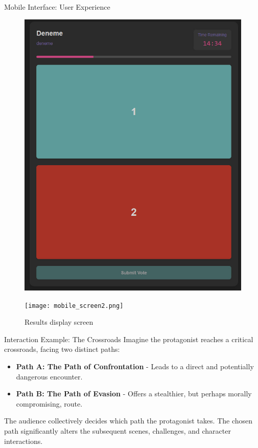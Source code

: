 \documentclass[aspectratio=169]{beamer}
\begin{document}
\begin{frame}{Mobile Interface: User Experience}
    \begin{figure}[h]
        \begin{minipage}{0.45\textwidth}
            \centering
            \includegraphics[height=0.7\textheight]{mobile_screen1.jpg}
            \caption{Audience voting interface}
        \end{minipage}
        \hfill
        \begin{minipage}{0.45\textwidth}
            \centering
            \texttt{[image: mobile\_screen2.png]}
            \caption{Results display screen}
        \end{minipage}
    \end{figure}
\end{frame}


\begin{frame}{Interaction Example: The Crossroads}
    Imagine the protagonist reaches a critical crossroads, facing two distinct paths:
    \begin{itemize}
        \item \textbf{Path A: The Path of Confrontation} - Leads to a direct and potentially dangerous encounter.
        \item \textbf{Path B: The Path of Evasion} - Offers a stealthier, but perhaps morally compromising, route.
    \end{itemize}
    The audience collectively decides which path the protagonist takes. The chosen path significantly alters the subsequent scenes, challenges, and character interactions.
\end{frame}
\end{document}
